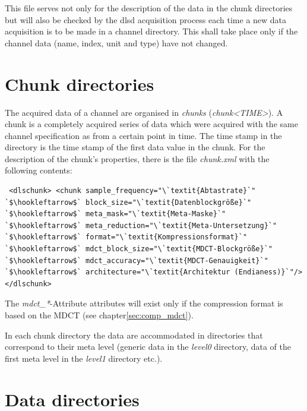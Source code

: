 \documentclass[a4paper,12pt,BCOR6mm,bibtotoc,idxtotoc]{scrbook}
\begin{document}
This file serves not only for the description of the data in the chunk directories but will also be checked by the dlsd acquisition process each time a new data acquisition is to be made in a channel directory. This shall take place only if the channel data (name, index, unit and type) have not changed.


\section{Chunk directories} \label{sec:data_chunks}

The acquired data of a channel are organised in \textit{chunks}
(\textit{chunk\textless TIME\textgreater}). A chunk is a
completely acquired series of data which were acquired with the same
channel specification as from a certain point in time. The time stamp
in the directory is the time stamp of the first data value in the
chunk. For the description of the chunk's properties, there is the
file \textit{chunk.xml} with the following contents:

\begin{lstlisting} <dlschunk> <chunk sample_frequency="\`textit{Abtastrate}`" `$\hookleftarrow$` block_size="\`textit{Datenblockgröße}`" `$\hookleftarrow$` meta_mask="\`textit{Meta-Maske}`" `$\hookleftarrow$` meta_reduction="\`textit{Meta-Untersetzung}`" `$\hookleftarrow$` format="\`textit{Kompressionsformat}`" `$\hookleftarrow$` mdct_block_size="\`textit{MDCT-Blockgröße}`" `$\hookleftarrow$` mdct_accuracy="\`textit{MDCT-Genauigkeit}`" `$\hookleftarrow$` architecture="\`textit{Architektur (Endianess)}`"/> </dlschunk> \end{lstlisting}

The \textit{mdct\_*}-Attribute attributes will exist only if the compression format is based on the MDCT (see chapter\ref{sec:comp_mdct}).

In each chunk directory the data are accommodated in directories that correspond to their meta level (generic data in the \textit{level0} directory, data of the first meta level in the \textit{level1} directory etc.).


\section{Data directories} \label{sec:data_data}
\end{document}
